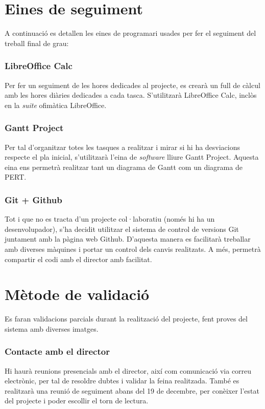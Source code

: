 \section{Eines de seguiment}
	A continuació es detallen les eines de programari usades per fer el seguiment del treball final de grau:
	\subsubsection{LibreOffice Calc}
		Per fer un seguiment de les hores dedicades al projecte, es crearà un full de càlcul amb les hores diàries dedicades a cada tasca. S'utilitzarà LibreOffice Calc, inclòs en
		la \textit{suite} ofimàtica LibreOffice.
	\subsubsection{Gantt Project}
		Per tal d'organitzar totes les tasques a realitzar i mirar si hi ha desviacions respecte el pla inicial, s'utilitzarà l'eina de \textit{software} lliure 
		Gantt Project\cite{GanttProject}. Aquesta eina ens permetrà realitzar tant un diagrama de Gantt com un diagrama de PERT.
	\subsubsection{Git + Github}
		Tot i que no es tracta d'un projecte col·laboratiu (només hi ha un desenvolupador), s'ha decidit utilitzar el sistema de control de versions Git juntament amb la pàgina web Github. 
		D'aquesta manera es facilitarà treballar amb diverses màquines i portar un control dels canvis realitzats. A més, permetrà compartir el codi amb el director amb facilitat.
	\section{Mètode de validació}
		Es faran validacions parcials durant la realització del projecte, fent proves del sistema amb diverses imatges.
	\subsubsection{Contacte amb el director}
		Hi haurà reunions presencials amb el director, així com comunicació via correu electrònic, per tal de resoldre dubtes i validar la feina realitzada. També es realitzarà una reunió de seguiment abans
		del 19 de decembre, per conèixer l'estat del projecte i poder escollir el torn de lectura.

